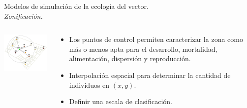 \begin{frame}[c]{Modelos de simulación de la ecología del vector.\\\textit{Zonificación.}}
  \begin{center}
   \begin{columns}[T]
        \begin{column}[T]{5cm}
            \includegraphics[width=5.5cm]{./graphics/zonificacion.png}
        \end{column}
        \begin{column}[T]{6cm}
          \begin{itemize}
          \item Los puntos de control permiten caracterizar la zona como más o menos apta para el desarrollo, mortalidad, alimentación, dispersión y reproducción.
          \item Interpolación espacial para determinar la cantidad de individuos en $(x, y)$.
          \item Definir una escala de clasificación.
          \end{itemize}
        \end{column}
    \end{columns}
  \end{center}
\end{frame}


